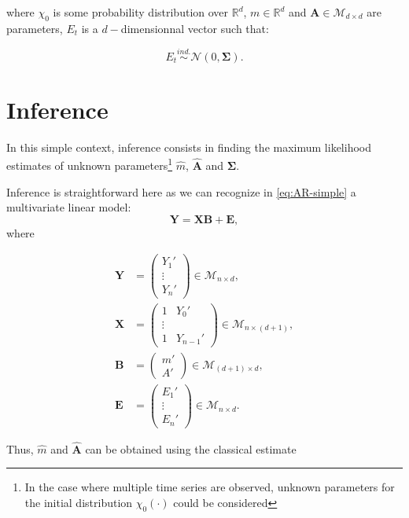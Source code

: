 \documentclass[]{book}
\begin{document}
where \(\chi_0\) is some probability distribution over \(\mathbb{R}^d\),
\(m\in\mathbb{R}^d\) and \(\mathbf{A}\in \mathcal{M}_{d\times d}\) are
parameters, \(E_t\) is a \(d-\)dimensionnal vector such that:

\begin{equation*}
E_t \overset{ind.}{\sim} \mathcal{N}\left(0, \mathbf{\Sigma}\right).
\end{equation*}

\section{Inference}\label{inference}

In this simple context, inference consists in finding the maximum
likelihood estimates of unknown
parameters\footnote{In the case where multiple time series are observed, unknown parameters for the initial distribution $\chi_0(\cdot)$ could be considered}
\(\hat{m}\), \(\hat{\mathbf{A}}\) and \(\mathbf{\Sigma}\).

Inference is straightforward here as we can recognize in
\eqref{eq:AR-simple} a multivariate linear model:
\[\mathbf{Y} = \mathbf{XB} + \mathbf{E},\] where

\begin{align*}
\mathbf{Y} &= 
\begin{pmatrix}
Y_1'\\
\vdots\\
Y_n'
\end{pmatrix} \in \mathcal{M}_{n \times d},\\
\mathbf{X} &= 
\begin{pmatrix}
1 & Y_0'\\
\vdots\\
1 & Y_{n-1}'
\end{pmatrix} \in \mathcal{M}_{n \times (d+1)},\\
\mathbf{B} &= 
\begin{pmatrix}
m'\\
A'
\end{pmatrix} \in \mathcal{M}_{(d + 1) \times d},\\
\mathbf{E} &= 
\begin{pmatrix}
E_1'\\
\vdots\\
E_n'
\end{pmatrix} \in \mathcal{M}_{n \times d}.
\end{align*}

Thus, \(\hat{m}\) and \(\hat{\mathbf{A}}\) can be obtained using the
classical estimate
\end{document}
